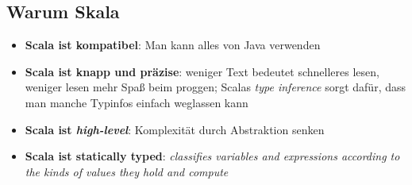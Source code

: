 \subsection{Warum Skala}
\begin{itemize}
  \item \textbf{Scala ist kompatibel}: Man kann alles
  von Java verwenden
  \item \textbf{Scala ist knapp und präzise}: weniger
  Text bedeutet schnelleres lesen, weniger lesen \und 
  mehr Spaß beim proggen; Scalas \textit{type inference}
  sorgt dafür, dass man manche Typinfos einfach weglassen
  kann
  \item \textbf{Scala ist \textit{high-level}}:
  Komplexität durch Abstraktion senken
  \item \textbf{Scala ist statically typed}: 
  \textit{classifies variables and expressions according
  to the kinds of values they hold and compute}
\end{itemize}
\pagebreak


